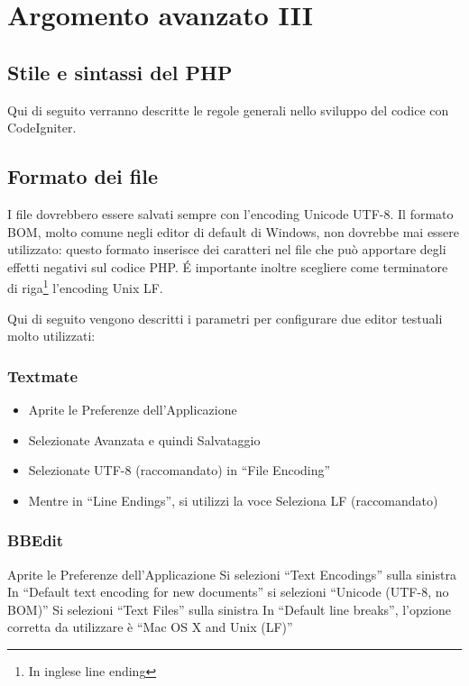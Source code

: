 \chapter{Argomento avanzato III}
\label{cap:stile}

\section{Stile e sintassi del PHP}
Qui di seguito verranno descritte le regole generali nello sviluppo del codice con CodeIgniter.

\section*{Formato dei file}
I file dovrebbero essere salvati sempre con l'encoding Unicode UTF-8. Il formato BOM, molto comune negli editor di default di Windows, non dovrebbe mai essere utilizzato: questo formato inserisce dei caratteri nel file che può apportare degli effetti negativi sul codice \ac{PHP}. \'E importante inoltre scegliere come terminatore di riga\footnote{In inglese line ending} l'encoding Unix LF.

Qui di seguito vengono descritti i parametri per configurare due editor testuali molto utilizzati:

\subsection*{Textmate}
\begin{itemize}
\item Aprite le Preferenze dell'Applicazione
\item Selezionate Avanzata e quindi Salvataggio
\item Selezionate UTF-8 (raccomandato) in ``File Encoding''
\item Mentre in ``Line Endings'', si utilizzi la voce Seleziona LF (raccomandato)
\end{itemize}

\subsection*{BBEdit}
Aprite le Preferenze dell'Applicazione
Si selezioni ``Text Encodings'' sulla sinistra
In ``Default text encoding for new documents'' si selezioni ``Unicode (UTF-8, no BOM)''
Si selezioni ``Text Files'' sulla sinistra
In ``Default line breaks'', l'opzione corretta da utilizzare è ``Mac OS X and Unix (LF)''

